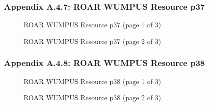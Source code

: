 \documentclass{article}[11pt]
\begin{document}
\subsubsection{Appendix A.4.7: ROAR WUMPUS Resource p37}
\begin{figure}[h]
\begin{center}
\end{center}
\caption{ROAR WUMPUS Resource p37 (page 1 of 3)}
\label{fig:roar-wumpus-resource-p37-page1}
\end{figure}
\newline
\begin{figure}[h]
\begin{center}
\end{center}
\caption{ROAR WUMPUS Resource p37 (page 2 of 3)}
\label{fig:roar-wumpus-resource-p37-page2}
\end{figure}
\newline
\newpage

\subsubsection{Appendix A.4.8: ROAR WUMPUS Resource p38}
\begin{figure}[h]
\begin{center}
\end{center}
\caption{ROAR WUMPUS Resource p38 (page 1 of 3)}
\label{fig:roar-wumpus-resource-p38-page1}
\end{figure}
\newline
\begin{figure}[h]
\begin{center}
\end{center}
\caption{ROAR WUMPUS Resource p38 (page 2 of 3)}
\label{fig:roar-wumpus-resource-p38-page2}
\end{figure}
\newline
\newpage
\end{document}
